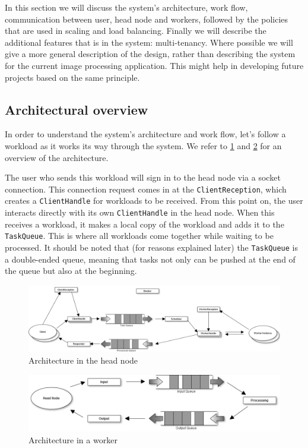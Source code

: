 \documentclass{stylesheet}
\begin{document}
In this section we will discuss the system's architecture, work flow, communication between user, head node and workers, followed by the policies that are used in scaling and load balancing. Finally we will describe the additional features that is in the system: multi-tenancy. Where possible we will give a more general description of the design, rather than describing the system for the current image processing application. This might help in developing future projects based on the same principle.

\subsection{Architectural overview}
\label{subsec:resourceManagement}
In order to understand the system's architecture and work flow, let's follow a workload as it works its way through the system. We refer to \cref{fig:headnode} and \cref{fig:worker} for an overview of the architecture.

The user who sends this workload will sign in to the head node via a socket connection. This connection request comes in at the \texttt{ClientReception}, which creates a \texttt{ClientHandle} for workloads to be received. From this point on, the user interacts directly with its own \texttt{ClientHandle} in the head node. When this receives a workload, it makes a local copy of the workload and adds it to the \texttt{TaskQueue}. This is where all workloads come together while waiting to be processed. It should be noted that (for reasons explained later) the \texttt{TaskQueue} is a double-ended queue, meaning that tasks not only can be pushed at the end of the queue but also at the beginning.

\begin{figure}
	\centering
	\includegraphics[width=\textwidth]{Architecture_head.png}
	\caption{Architecture in the head node}
	\label{fig:headnode}
\end{figure}

\begin{figure}
	\centering
	\includegraphics[width=0.8 \linewidth]{Architecture_worker.png}
	\caption{Architecture in a worker}
	\label{fig:worker}
\end{figure}
\end{document}
